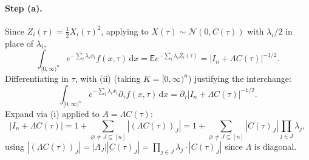 \documentclass[12pt,a4paper]{article}
\theoremstyle{definition}
\newcommand{\EE}{\mathsf{E}}
\newcommand{\dd}{\mathrm{d}}
\newcommand{\caln}{\mathcal{N}}
\begin{document}
\paragraph{Step (a).}  Since $Z_i(\tau)=\tfrac12 X_i(\tau)^2$, applying
 to $X(\tau)\sim\caln(0,C(\tau))$ with $\lambda_i/2$ in
place of $\lambda_i$,
\[
  \int_{[0,\infty)^n}e^{-\sum_i\lambda_ix_i}f(x,\tau)\,\dd x
  =\EE e^{-\sum_i\lambda_iZ_i(\tau)}
  =|I_n+\Lambda C(\tau)|^{-1/2}.
\]
Differentiating in $\tau$, with (ii) (taking $K=[0,\infty)^n$)
justifying the interchange:
\begin{equation}\label{eq:lt_deriv}
  \int_{[0,\infty)^n}e^{-\sum_i\lambda_ix_i}
  \partial_\tau f(x,\tau)\,\dd x
  =\partial_\tau|I_n+\Lambda C(\tau)|^{-1/2}.
\end{equation}
Expand via (i) applied to $A=\Lambda C(\tau)$:
\begin{equation}\label{eq:det_expansion}
  |I_n+\Lambda C(\tau)|
  =1+\sum_{\varnothing\ne J\subseteq[n]}|(\Lambda C(\tau))_J|
  =1+\sum_{\varnothing\ne J\subseteq[n]}|C(\tau)_J|\prod_{j\in J}\lambda_j,
\end{equation}
using $|(\Lambda C(\tau))_J|=|\Lambda_J||C(\tau)_J|=\prod_{j\in J}\lambda_j\cdot|C(\tau)_J|$
since $\Lambda$ is diagonal.
\end{document}
